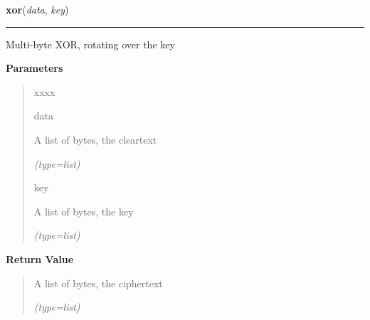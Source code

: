 \hspace{.8\funcindent}\begin{boxedminipage}{\funcwidth}

    \raggedright \textbf{xor}(\textit{data}, \textit{key})

    \vspace{-1.5ex}

    \rule{\textwidth}{0.5\fboxrule}
\setlength{\parskip}{2ex}
    Multi-byte XOR, rotating over the key

\setlength{\parskip}{1ex}
      \textbf{Parameters}
      \vspace{-1ex}

      \begin{quote}
        \begin{Ventry}{xxxx}

          \item[data]

          A list of bytes, the cleartext

            {\it (type=list)}

          \item[key]

          A list of bytes, the key

            {\it (type=list)}

        \end{Ventry}

      \end{quote}

      \textbf{Return Value}
    \vspace{-1ex}

      \begin{quote}
      A list of bytes, the ciphertext

      {\it (type=list)}

      \end{quote}

    \end{boxedminipage}

    \label{helpers:toHexString}

    \vspace{0.5ex}

